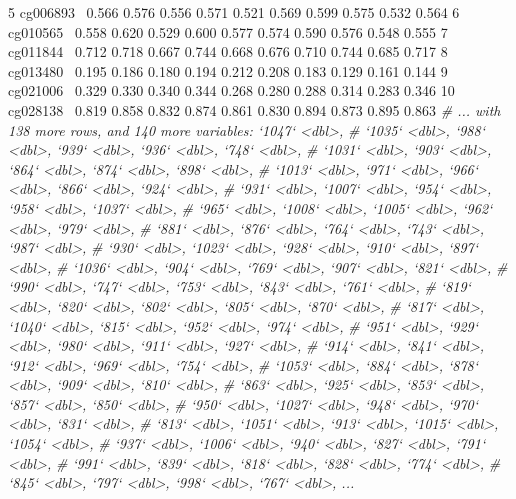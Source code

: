 \documentclass[]{article}
\newcommand{\hlnum}[1]{\textcolor[rgb]{0.816,0.125,0.439}{#1}}%
\newcommand{\hlstr}[1]{\textcolor[rgb]{0.251,0.627,0.251}{#1}}%
\newcommand{\hlcom}[1]{\textcolor[rgb]{0.502,0.502,0.502}{\textit{#1}}}%
\newcommand{\hlopt}[1]{\textcolor[rgb]{0,0,0}{#1}}%
\newcommand{\hlstd}[1]{\textcolor[rgb]{0.251,0.251,0.251}{#1}}%
\newenvironment{Shaded}{\begin{myshaded}}{\end{myshaded}}
\newcommand{\DecValTok}[1]{\hlnum{#1}}
\newcommand{\FloatTok}[1]{\hlnum{#1}}
\newcommand{\StringTok}[1]{\hlstr{#1}}
\newcommand{\CommentTok}[1]{\hlcom{#1}}
\newcommand{\OperatorTok}[1]{\hlopt{#1}}
\newcommand{\NormalTok}[1]{\hlstd{#1}}
\begin{document}
\begin{Shaded}
\begin{Highlighting}[]
   \DecValTok{5}\NormalTok{ cg006893}\OperatorTok{~}\StringTok{ }\FloatTok{0.566}  \FloatTok{0.576}  \FloatTok{0.556}  \FloatTok{0.571} \FloatTok{0.521}  \FloatTok{0.569} \FloatTok{0.599} \FloatTok{0.575} \FloatTok{0.532}  \FloatTok{0.564}
   \DecValTok{6}\NormalTok{ cg010565}\OperatorTok{~}\StringTok{ }\FloatTok{0.558}  \FloatTok{0.620}  \FloatTok{0.529}  \FloatTok{0.600} \FloatTok{0.577}  \FloatTok{0.574} \FloatTok{0.590} \FloatTok{0.576} \FloatTok{0.548}  \FloatTok{0.555}
   \DecValTok{7}\NormalTok{ cg011844}\OperatorTok{~}\StringTok{ }\FloatTok{0.712}  \FloatTok{0.718}  \FloatTok{0.667}  \FloatTok{0.744} \FloatTok{0.668}  \FloatTok{0.676} \FloatTok{0.710} \FloatTok{0.744} \FloatTok{0.685}  \FloatTok{0.717}
   \DecValTok{8}\NormalTok{ cg013480}\OperatorTok{~}\StringTok{ }\FloatTok{0.195}  \FloatTok{0.186}  \FloatTok{0.180}  \FloatTok{0.194} \FloatTok{0.212}  \FloatTok{0.208} \FloatTok{0.183} \FloatTok{0.129} \FloatTok{0.161}  \FloatTok{0.144}
   \DecValTok{9}\NormalTok{ cg021006}\OperatorTok{~}\StringTok{ }\FloatTok{0.329}  \FloatTok{0.330}  \FloatTok{0.340}  \FloatTok{0.344} \FloatTok{0.268}  \FloatTok{0.280} \FloatTok{0.288} \FloatTok{0.314} \FloatTok{0.283}  \FloatTok{0.346}
  \DecValTok{10}\NormalTok{ cg028138}\OperatorTok{~}\StringTok{ }\FloatTok{0.819}  \FloatTok{0.858}  \FloatTok{0.832}  \FloatTok{0.874} \FloatTok{0.861}  \FloatTok{0.830} \FloatTok{0.894} \FloatTok{0.873} \FloatTok{0.895}  \FloatTok{0.863}
  \CommentTok{# ... with 138 more rows, and 140 more variables: `1047` <dbl>,}
  \CommentTok{#   `1035` <dbl>, `988` <dbl>, `939` <dbl>, `936` <dbl>, `748` <dbl>,}
  \CommentTok{#   `1031` <dbl>, `903` <dbl>, `864` <dbl>, `874` <dbl>, `898` <dbl>,}
  \CommentTok{#   `1013` <dbl>, `971` <dbl>, `966` <dbl>, `866` <dbl>, `924` <dbl>,}
  \CommentTok{#   `931` <dbl>, `1007` <dbl>, `954` <dbl>, `958` <dbl>, `1037` <dbl>,}
  \CommentTok{#   `965` <dbl>, `1008` <dbl>, `1005` <dbl>, `962` <dbl>, `979` <dbl>,}
  \CommentTok{#   `881` <dbl>, `876` <dbl>, `764` <dbl>, `743` <dbl>, `987` <dbl>,}
  \CommentTok{#   `930` <dbl>, `1023` <dbl>, `928` <dbl>, `910` <dbl>, `897` <dbl>,}
  \CommentTok{#   `1036` <dbl>, `904` <dbl>, `769` <dbl>, `907` <dbl>, `821` <dbl>,}
  \CommentTok{#   `990` <dbl>, `747` <dbl>, `753` <dbl>, `843` <dbl>, `761` <dbl>,}
  \CommentTok{#   `819` <dbl>, `820` <dbl>, `802` <dbl>, `805` <dbl>, `870` <dbl>,}
  \CommentTok{#   `817` <dbl>, `1040` <dbl>, `815` <dbl>, `952` <dbl>, `974` <dbl>,}
  \CommentTok{#   `951` <dbl>, `929` <dbl>, `980` <dbl>, `911` <dbl>, `927` <dbl>,}
  \CommentTok{#   `914` <dbl>, `841` <dbl>, `912` <dbl>, `969` <dbl>, `754` <dbl>,}
  \CommentTok{#   `1053` <dbl>, `884` <dbl>, `878` <dbl>, `909` <dbl>, `810` <dbl>,}
  \CommentTok{#   `863` <dbl>, `925` <dbl>, `853` <dbl>, `857` <dbl>, `850` <dbl>,}
  \CommentTok{#   `950` <dbl>, `1027` <dbl>, `948` <dbl>, `970` <dbl>, `831` <dbl>,}
  \CommentTok{#   `813` <dbl>, `1051` <dbl>, `913` <dbl>, `1015` <dbl>, `1054` <dbl>,}
  \CommentTok{#   `937` <dbl>, `1006` <dbl>, `940` <dbl>, `827` <dbl>, `791` <dbl>,}
  \CommentTok{#   `991` <dbl>, `839` <dbl>, `818` <dbl>, `828` <dbl>, `774` <dbl>,}
  \CommentTok{#   `845` <dbl>, `797` <dbl>, `998` <dbl>, `767` <dbl>, ...}
\end{Highlighting}
\end{Shaded}
\end{document}
